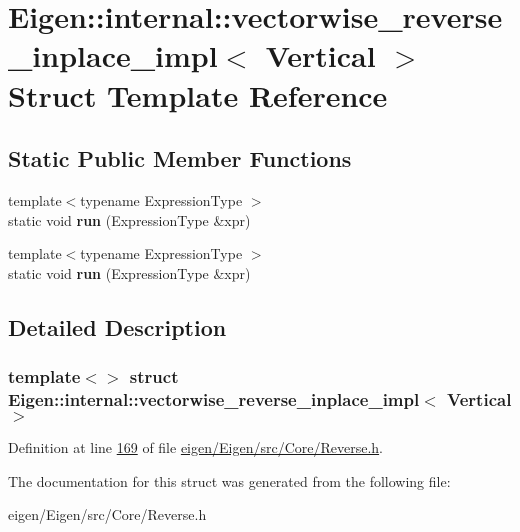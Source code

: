 \hypertarget{struct_eigen_1_1internal_1_1vectorwise__reverse__inplace__impl_3_01_vertical_01_4}{}\section{Eigen\+:\+:internal\+:\+:vectorwise\+\_\+reverse\+\_\+inplace\+\_\+impl$<$ Vertical $>$ Struct Template Reference}
\label{struct_eigen_1_1internal_1_1vectorwise__reverse__inplace__impl_3_01_vertical_01_4}
\subsection*{Static Public Member Functions}
\begin{DoxyCompactItemize}
\item 
\mbox{\label{struct_eigen_1_1internal_1_1vectorwise__reverse__inplace__impl_3_01_vertical_01_4_a6e2803bb51f9e526378517cfae09b35f}} 
{\footnotesize template$<$typename Expression\+Type $>$ }\\static void {\bfseries run} (Expression\+Type \&xpr)
\item 
\mbox{\label{struct_eigen_1_1internal_1_1vectorwise__reverse__inplace__impl_3_01_vertical_01_4_a6e2803bb51f9e526378517cfae09b35f}} 
{\footnotesize template$<$typename Expression\+Type $>$ }\\static void {\bfseries run} (Expression\+Type \&xpr)
\end{DoxyCompactItemize}


\subsection{Detailed Description}
\subsubsection*{template$<$$>$\newline
struct Eigen\+::internal\+::vectorwise\+\_\+reverse\+\_\+inplace\+\_\+impl$<$ Vertical $>$}



Definition at line \hyperlink{eigen_2_eigen_2src_2_core_2_reverse_8h_source_l00169}{169} of file \hyperlink{eigen_2_eigen_2src_2_core_2_reverse_8h_source}{eigen/\+Eigen/src/\+Core/\+Reverse.\+h}.



The documentation for this struct was generated from the following file\+:\begin{DoxyCompactItemize}
\item 
eigen/\+Eigen/src/\+Core/\+Reverse.\+h\end{DoxyCompactItemize}
